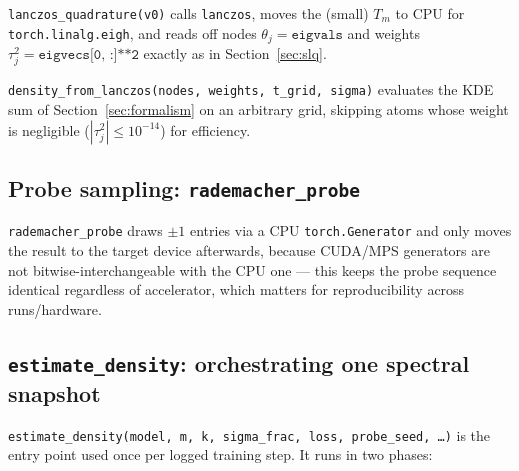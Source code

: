 \documentclass[11pt]{article}
\newcommand{\code}[1]{\texttt{#1}}
\begin{document}
\code{lanczos_quadrature(v0)} calls \code{lanczos}, moves the (small) \(T_m\)
to CPU for \code{torch.linalg.eigh}, and reads off nodes
\(\theta_j = \code{eigvals}\) and weights \(\tau_j^2 =
\code{eigvecs[0, :]**2}\) exactly as in Section~\ref{sec:slq}.

\code{density_from_lanczos(nodes, weights, t_grid, sigma)} evaluates the
KDE sum of Section~\ref{sec:formalism} on an arbitrary grid, skipping atoms
whose weight is negligible (\(|\tau_j^2| \le 10^{-14}\)) for efficiency.

\subsection{Probe sampling: \code{rademacher_probe}}

\code{rademacher_probe} draws \(\pm1\) entries via a CPU
\code{torch.Generator} and only moves the result to the target device
afterwards, because CUDA/MPS generators are not bitwise-interchangeable
with the CPU one --- this keeps the probe sequence identical regardless of
accelerator, which matters for reproducibility across runs/hardware.

\subsection{\code{estimate_density}: orchestrating one spectral snapshot}
\label{sec:estimate_density}

\code{estimate_density(model, m, k, sigma_frac, loss, probe_seed, \ldots)}
is the entry point used once per logged training step. It runs in two
phases:
\end{document}
